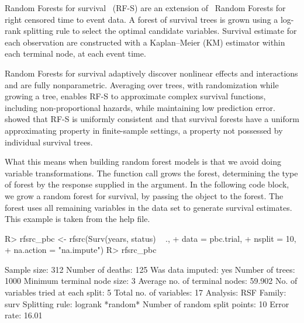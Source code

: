 \documentclass[nojss]{jss}\usepackage[]{graphicx}\usepackage[]{color}
\begin{document}
Random Forests for survival~\citep{Ishwaran:2007, Ishwaran:2008} (RF-S) are an extension of~\cite{Breiman:2001} Random Forests for right censored time to event data. A forest of survival trees is grown using a log-rank splitting rule to select the optimal candidate variables. Survival estimate for each observation are constructed with a Kaplan--Meier (KM) estimator within each terminal node, at each event time. 

Random Forests for survival adaptively discover nonlinear effects and interactions and are fully nonparametric. Averaging over trees, with randomization while growing a tree, enables RF-S to approximate complex survival functions, including non-proportional hazards, while maintaining low prediction error. \cite{Ishwaran:2010a} showed that RF-S is uniformly consistent and that survival forests have a uniform approximating property in finite-sample settings, a property not possessed by individual survival trees.

What this means when building random forest models is that we avoid doing variable transformations. The   function call grows the forest, determining the type of forest by the response supplied in the  argument. In the following code block, we grow a random forest for survival, by passing the  object to the forest. The forest uses all remaining variables in the  data set to generate survival estimates. This example is taken from the  help file.

\begin{Schunk}
\begin{Sinput}
R> rfsrc_pbc <- rfsrc(Surv(years, status) ~ ., 
+                    data = pbc.trial, 
+                    nsplit = 10, 
+                    na.action = "na.impute")
R> rfsrc_pbc
\end{Sinput}
\end{Schunk}

\begin{Schunk}
\begin{Soutput}
                         Sample size: 312
                    Number of deaths: 125
                    Was data imputed: yes
                     Number of trees: 1000
          Minimum terminal node size: 3
       Average no. of terminal nodes: 59.902
No. of variables tried at each split: 5
              Total no. of variables: 17
                            Analysis: RSF
                              Family: surv
                      Splitting rule: logrank *random*
       Number of random split points: 10
                          Error rate: 16.01%
\end{Soutput}
\end{Schunk}
\end{document}
